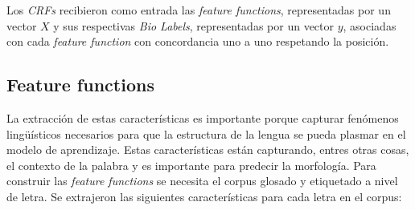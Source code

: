 \documentclass[letterpaper,12pt,oneside]{book}
\theoremstyle{definition}
\begin{document}

Los \textit{CRFs} recibieron como entrada las \textit{feature functions}, representadas por un vector $X$ y sus respectivas \textit{Bio Labels}, representadas por un vector $y$, asociadas con cada \textit{feature function} con concordancia uno a uno respetando la posición. 

\subsection{Feature functions} \label{subsec:feature}

La extracción de estas características es importante porque capturar fenómenos lingüísticos necesarios para que la estructura de la lengua se pueda plasmar en el modelo de aprendizaje. Estas características están capturando, entres otras cosas, el contexto de la palabra y es importante para predecir la morfología. Para construir las \textit{feature functions} se necesita el corpus glosado y etiquetado a nivel de letra. Se extrajeron las siguientes características para cada letra en el corpus:
\end{document}
